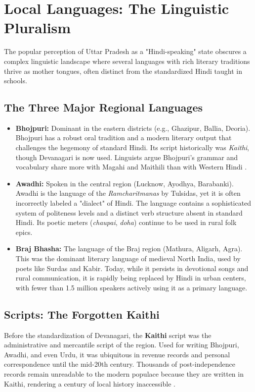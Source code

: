 \documentclass{article}
\begin{document}
\section{Local Languages: The Linguistic Pluralism}
The popular perception of Uttar Pradesh as a "Hindi-speaking" state obscures a complex linguistic landscape where several languages with rich literary traditions thrive as mother tongues, often distinct from the standardized Hindi taught in schools.

\subsection{The Three Major Regional Languages}
\begin{itemize}
    \item \textbf{Bhojpuri:} Dominant in the eastern districts (e.g., Ghazipur, Ballia, Deoria). Bhojpuri has a robust oral tradition and a modern literary output that challenges the hegemony of standard Hindi. Its script historically was \textit{Kaithi}, though Devanagari is now used. Linguists argue Bhojpuri’s grammar and vocabulary share more with Magahi and Maithili than with Western Hindi \cite{grierson1903linguistic}.
    \item \textbf{Awadhi:} Spoken in the central region (Lucknow, Ayodhya, Barabanki). Awadhi is the language of the \textit{Ramcharitmanas} by Tulsidas, yet it is often incorrectly labeled a "dialect" of Hindi. The language contains a sophisticated system of politeness levels and a distinct verb structure absent in standard Hindi. Its poetic meters (\textit{chaupai}, \textit{doha}) continue to be used in rural folk epics.
    \item \textbf{Braj Bhasha:} The language of the Braj region (Mathura, Aligarh, Agra). This was the dominant literary language of medieval North India, used by poets like Surdas and Kabir. Today, while it persists in devotional songs and rural communication, it is rapidly being replaced by Hindi in urban centers, with fewer than 1.5 million speakers actively using it as a primary language.
\end{itemize}

\subsection{Scripts: The Forgotten Kaithi}
Before the standardization of Devanagari, the \textbf{Kaithi} script was the administrative and mercantile script of the region. Used for writing Bhojpuri, Awadhi, and even Urdu, it was ubiquitous in revenue records and personal correspondence until the mid-20th century. Thousands of post-independence records remain unreadable to the modern populace because they are written in Kaithi, rendering a century of local history inaccessible \cite{pandey2007kaithi}.
\end{document}
